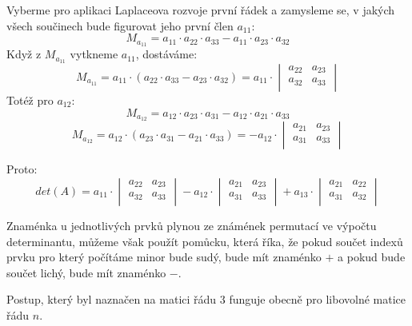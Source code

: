 Vyberme pro aplikaci Laplaceova rozvoje první řádek a zamysleme
se, v jakých všech součinech bude figurovat jeho první člen $a_{11}$:
$$M_{a_{11}} = a_{11} \cdot a_{22} \cdot a_{33} - a_{11} \cdot a_{23} \cdot a_{32}$$
Když z $M_{a_{11}}$ vytkneme $a_{11}$, dostáváme:
\[
    M_{a_{11}} =
    a_{11} \cdot (a_{22} \cdot a_{33} - a_{23} \cdot a_{32}) =
    a_{11} \cdot
    \begin{vmatrix}
        a_{22} & a_{23} \\
        a_{32} & a_{33} \\
    \end{vmatrix}
\]
Totéž pro $a_{12}$:
    $$M_{a_{12}} = a_{12} \cdot a_{23} \cdot a_{31} - a_{12} \cdot a_{21} \cdot a_{33}$$
\[
    M_{a_{12}} =
    a_{12} \cdot (a_{23} \cdot a_{31} - a_{21} \cdot a_{33}) =
    - a_{12} \cdot
    \begin{vmatrix}
        a_{21} & a_{23} \\
        a_{31} & a_{33} \\
    \end{vmatrix}
\]

Proto:
\[
    det(A) =
        a_{11} \cdot
            \begin{vmatrix}
                a_{22} & a_{23} \\
                a_{32} & a_{33} \\
            \end{vmatrix} -
        a_{12} \cdot
        \begin{vmatrix}
            a_{21} & a_{23} \\
            a_{31} & a_{33} \\
        \end{vmatrix} +
        a_{13} \cdot
        \begin{vmatrix}
            a_{21} & a_{22} \\
            a_{31} & a_{32} \\
        \end{vmatrix}
\]

Znaménka u jednotlivých prvků plynou ze známének permutací ve výpočtu determinantu,
můžeme však použít pomůcku, která říka, že pokud součet indexů prvku pro který počítáme
minor bude sudý, bude mít znaménko $+$ a pokud bude součet lichý, bude mít znaménko $-$.

Postup, který byl naznačen na matici řádu $3$ funguje obecně pro libovolné matice řádu $n$.

